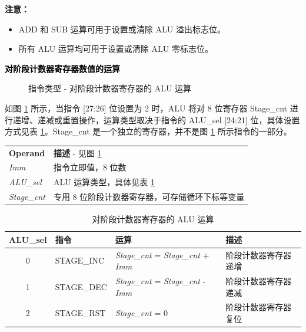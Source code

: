 \documentclass[main\_\_CN.tex]{subfiles}
\begin{document}
\textbf{注意：}
\begin{itemize}
    \item ADD 和 SUB 运算可用于设置或清除 ALU 溢出标志位。
    \item 所有 ALU 运算均可用于设置或清除 ALU 零标志位。
\end{itemize}

\newpage

\textcolor{black}{\bfseries 对阶段计数器寄存器数值的运算}\label{section:alu-cnt}


%
%
%
%
%
%
%
\begin{figure}[!ht]
    \centering
    \caption{指令类型 - 对阶段计数器寄存器的 ALU 运算}
    \label{figure:ALU-with-stage-count}
\end{figure}

如图 \ref{figure:ALU-with-stage-count} 所示，当指令 [27:26] 位设置为 2 时，ALU 将对 8 位寄存器 Stage\_cnt 进行递增、递减或重置操作，运算类型取决于指令的 ALU\_sel [24:21] 位，具体设置方式见表 \ref{figure:ALU-with-stage-count}。Stage\_cnt 是一个独立的寄存器，并不是图 \ref{figure:ALU-with-stage-count} 所示指令的一部分。

\begin{tabular}{ l l }
\textbf{Operand} & \textbf{描述} - 见图 \ref{figure:ALU-with-stage-count} \\
\textit{Imm} & 指令立即值，8 位数 \\
\textit{ALU\_sel} & ALU 运算类型，具体见表 \ref{figure:ALU-with-stage-count}\\
\textit{Stage\_cnt} & 专用 8 位阶段计数器寄存器，可存储循环下标等变量
\end{tabular}


\begin{table}[!ht]
    \centering
    \begin{tabular}{ c l l l }
    \textbf{ALU\_sel} & \textbf{指令} & \textbf{运算} & \textbf{描述} \\ \hline
    0 & STAGE\_INC & \textit{Stage\_cnt} = \textit{Stage\_cnt} + \textit{Imm} & 阶段计数器寄存器递增 \\
    1 & STAGE\_DEC & \textit{Stage\_cnt} = \textit{Stage\_cnt} - \textit{Imm} & 阶段计数器寄存器递减 \\
    2 & STAGE\_RST & \textit{Stage\_cnt} = 0 & 阶段计数器寄存器复位
    \end{tabular}
    \caption{对阶段计数器寄存器的 ALU 运算}
    \label{table:ALU-with-stage-count}
\end{table}
\end{document}
